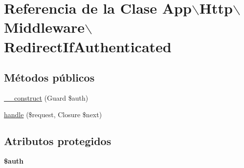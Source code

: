 \hypertarget{class_app_1_1_http_1_1_middleware_1_1_redirect_if_authenticated}{\section{\-Referencia de la \-Clase \-App$\backslash$\-Http$\backslash$\-Middleware$\backslash$\-Redirect\-If\-Authenticated}
\label{class_app_1_1_http_1_1_middleware_1_1_redirect_if_authenticated}
}
\subsection*{\-Métodos públicos}
\begin{DoxyCompactItemize}
\item 
\hyperlink{class_app_1_1_http_1_1_middleware_1_1_redirect_if_authenticated_afd08c3d4ebb9c81b3e883c18286e2b20}{\-\_\-\-\_\-construct} (\-Guard \$auth)
\item 
\hyperlink{class_app_1_1_http_1_1_middleware_1_1_redirect_if_authenticated_a7918fd539ad0b90df5d39cc47e1c660d}{handle} (\$request, \-Closure \$next)
\end{DoxyCompactItemize}
\subsection*{\-Atributos protegidos}
\begin{DoxyCompactItemize}
\item 
\hypertarget{class_app_1_1_http_1_1_middleware_1_1_redirect_if_authenticated_a3b7eb7fd705e23eabb6724ff025de42d}{{\bfseries \$auth}}\label{class_app_1_1_http_1_1_middleware_1_1_redirect_if_authenticated_a3b7eb7fd705e23eabb6724ff025de42d}

\end{DoxyCompactItemize}



